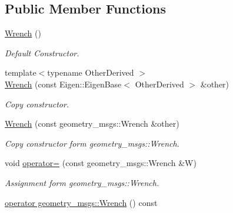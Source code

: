 \subsection*{Public Member Functions}
\begin{DoxyCompactItemize}
\item 
\hyperlink{classow__core_1_1Wrench_a3b052077efbd8a5029346ffb3507ab92}{Wrench} ()\hypertarget{classow__core_1_1Wrench_a3b052077efbd8a5029346ffb3507ab92}{}\label{classow__core_1_1Wrench_a3b052077efbd8a5029346ffb3507ab92}

\begin{DoxyCompactList}\small\item\em Default Constructor. \end{DoxyCompactList}\item 
{\footnotesize template$<$typename Other\+Derived $>$ }\\\hyperlink{classow__core_1_1Wrench_a78e79150a8f7377ff4cb9be4f203a20d}{Wrench} (const Eigen\+::\+Eigen\+Base$<$ Other\+Derived $>$ \&other)
\begin{DoxyCompactList}\small\item\em Copy constructor. \end{DoxyCompactList}\item 
\hyperlink{classow__core_1_1Wrench_a57d2dfb70214e79f720d064124a8e102}{Wrench} (const geometry\+\_\+msgs\+::\+Wrench \&other)\hypertarget{classow__core_1_1Wrench_a57d2dfb70214e79f720d064124a8e102}{}\label{classow__core_1_1Wrench_a57d2dfb70214e79f720d064124a8e102}

\begin{DoxyCompactList}\small\item\em Copy constructor form geometry\+\_\+msgs\+::\+Wrench. \end{DoxyCompactList}\item 
void \hyperlink{classow__core_1_1Wrench_a8fcbb87b2ff0e2c7742def7ac08903ba}{operator=} (const geometry\+\_\+msgs\+::\+Wrench \&W)\hypertarget{classow__core_1_1Wrench_a8fcbb87b2ff0e2c7742def7ac08903ba}{}\label{classow__core_1_1Wrench_a8fcbb87b2ff0e2c7742def7ac08903ba}

\begin{DoxyCompactList}\small\item\em Assignment form geometry\+\_\+msgs\+::\+Wrench. \end{DoxyCompactList}\item 
\hyperlink{classow__core_1_1Wrench_a08aa041f5fc3fbe34dbede0807d10e1e}{operator geometry\+\_\+msgs\+::\+Wrench} () const \hypertarget{classow__core_1_1Wrench_a08aa041f5fc3fbe34dbede0807d10e1e}{}\label{classow__core_1_1Wrench_a08aa041f5fc3fbe34dbede0807d10e1e}


\end{DoxyCompactItemize}

